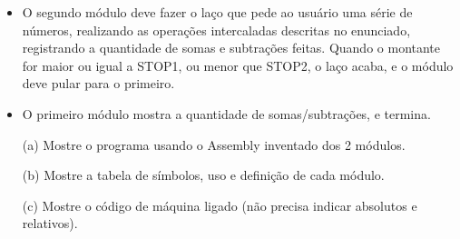 \begin{enumerate}
\begin{itemize}
        \item
        O segundo módulo deve fazer o laço
        que pede ao usuário uma série de números,
        realizando as operações intercaladas descritas no enunciado,
        registrando a quantidade de somas e subtrações feitas.
        Quando o montante for maior ou igual a STOP1, ou menor que STOP2,
        o laço acaba, e o módulo deve pular para o primeiro.

        \item
        O primeiro módulo mostra a quantidade de somas/subtrações, e termina.
    \end{itemize}

    \begin{itemize}
        \item [(a)]
        Mostre o programa usando o Assembly inventado dos 2 módulos.

        \item [(b)]
        Mostre a tabela de símbolos, uso e definição de cada módulo.

        \item [(c)]
        Mostre o código de máquina ligado
        (não precisa indicar absolutos e relativos).
    \end{itemize}
\end{enumerate}
